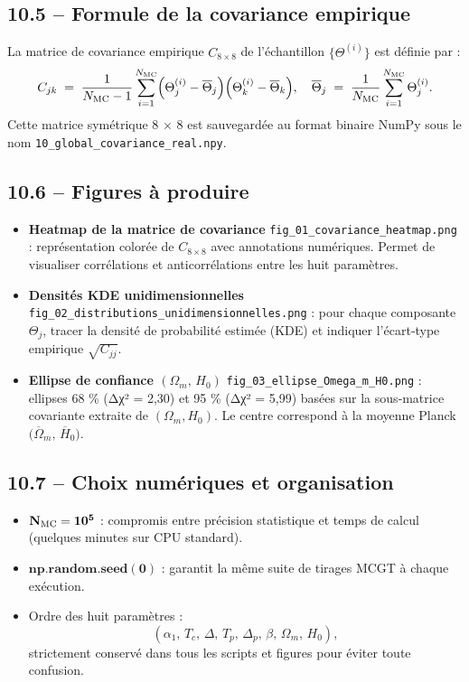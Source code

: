 \subsection{10.5 – Formule de la covariance empirique}
La matrice de covariance empirique \(C_{8\times8}\) de l’échantillon \(\{\Theta^{(i)}\}\) est définie par :
\[
  C_{jk}
  \;=\;
  \frac{1}{N_{\rm MC} - 1}
  \sum_{i=1}^{N_{\rm MC}}
    \Bigl(\Theta_{j}^{(i)} - \overline{\Theta}_{j}\Bigr)
    \Bigl(\Theta_{k}^{(i)} - \overline{\Theta}_{k}\Bigr),
  \quad
  \overline{\Theta}_{j}
  \;=\;
  \frac{1}{N_{\rm MC}}
  \sum_{i=1}^{N_{\rm MC}} \Theta_{j}^{(i)}.
\]
Cette matrice symétrique 8 × 8 est sauvegardée au format binaire NumPy sous le nom \texttt{10\_global\_covariance\_real.npy}.

\subsection{10.6 – Figures à produire}

\begin{itemize}
  \item \textbf{Heatmap de la matrice de covariance}
    \texttt{fig\_01\_covariance\_heatmap.png} :
    représentation colorée de \(C_{8\times8}\) avec annotations numériques.
    Permet de visualiser corrélations et anticorrélations entre les huit paramètres.

  \item \textbf{Densités KDE unidimensionnelles}
    \texttt{fig\_02\_distributions\_unidimensionnelles.png} :
    pour chaque composante \(\Theta_{j}\), tracer la densité de probabilité estimée (KDE) et indiquer l’écart‐type empirique \(\sqrt{C_{jj}}\).

  \item \textbf{Ellipse de confiance \((\Omega_{m},\,H_{0})\)}
    \texttt{fig\_03\_ellipse\_Omega\_m\_H0.png} :
    ellipses 68 \% (Δχ² = 2,30) et 95 \% (Δχ² = 5,99) basées sur la sous‐matrice covariante extraite de \((\Omega_{m},H_{0})\).
    Le centre correspond à la moyenne Planck \(\bigl(\overline{\Omega}_{m},\,\overline{H}_{0}\bigr)\).

\end{itemize}

\subsection{10.7 – Choix numériques et organisation}

\begin{itemize}
  \item \(\mathbf{N_{\rm MC} = 10^{5}}\) : compromis entre précision statistique et temps de calcul (quelques minutes sur CPU standard).
  \item \(\mathbf{np.random.seed(0)}\) : garantit la même suite de tirages MCGT à chaque exécution.
  \item Ordre des huit paramètres :
    \[
      (\alpha_{1},\,T_{c},\,\Delta,\,T_{p},\,\Delta_{p},\,\beta,\,\Omega_{m},\,H_{0}),
    \]
    strictement conservé dans tous les scripts et figures pour éviter toute confusion.
\end{itemize}

